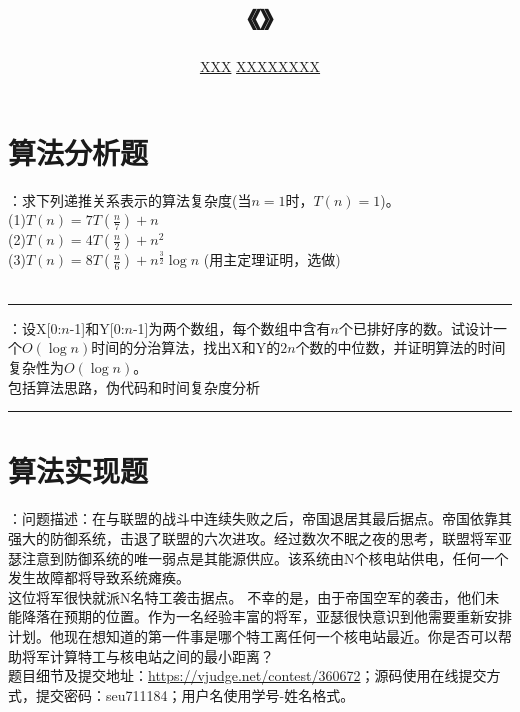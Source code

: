 \documentclass[UTF8,16pt]{article} %
\title{《\heiti{算法设计与分析}》\heiti{第{\color{red}2}次作业}}
\author{\kaishu{姓名：}\underline{XXX} \quad\quad\quad\quad\quad  \kaishu{学号：}\underline{XXXXXXXX}}
\date{}
\begin{document}
	
\maketitle
\vbox{} %

\section*{\textbf{算法分析题}}
：求下列递推关系表示的算法复杂度(当$n=1$时，$T(n)=1$)。\\
(1)$T(n)=7T(\frac{n}{7})+n$\\
(2)$T(n)=4T(\frac{n}{2}) + n^2$\\
(3)$T(n)=8T(\frac{n}{6})+n^{\frac{3}{2}}\log n$ (用主定理证明，选做)\\
{}\\
\rule[0pt]{14.3cm}{0.05em}

\vbox{} %
：设X[0:$n$-1]和Y[0:$n$-1]为两个数组，每个数组中含有$n$个已排好序的数。试设计一个$O(\log n)$时间的分治算法，找出X和Y的$2n$个数的中位数，并证明算法的时间复杂性为$O(\log n)$。\\
{}包括算法思路，伪代码和时间复杂度分析\\
\rule[0pt]{14.3cm}{0.05em}


\vbox{} %
\vbox{} %
\section*{\textbf{算法实现题}}
\noindent
{}：问题描述：在与联盟的战斗中连续失败之后，帝国退居其最后据点。帝国依靠其强大的防御系统，击退了联盟的六次进攻。经过数次不眠之夜的思考，联盟将军亚瑟注意到防御系统的唯一弱点是其能源供应。该系统由N个核电站供电，任何一个发生故障都将导致系统瘫痪。\\
\indent
这位将军很快就派N名特工袭击据点。 不幸的是，由于帝国空军的袭击，他们未能降落在预期的位置。作为一名经验丰富的将军，亚瑟很快意识到他需要重新安排计划。他现在想知道的第一件事是哪个特工离任何一个核电站最近。你是否可以帮助将军计算特工与核电站之间的最小距离？\\
\indent
题目细节及提交地址：\url{https://vjudge.net/contest/360672}；源码使用在线提交方式，提交密码：seu711184；用户名使用学号-姓名格式。\\
{}\\
{}\\
\end{document}
